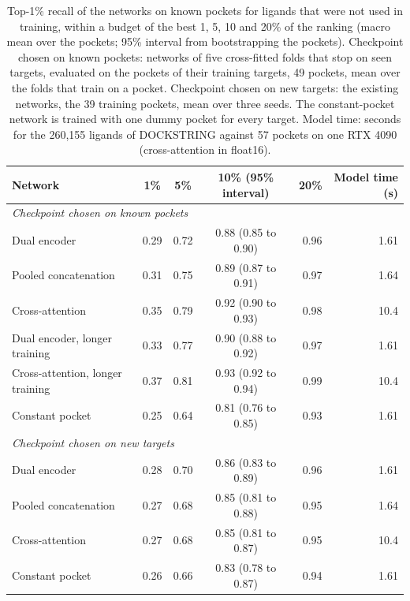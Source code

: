 \begin{table}[h]
\caption{Top-1\% recall of the networks on known pockets for ligands that were not used in training, within a budget of the best 1, 5, 10 and 20\% of the ranking (macro mean over the pockets; 95\% interval from bootstrapping the pockets). Checkpoint chosen on known pockets: networks of five cross-fitted folds that stop on seen targets, evaluated on the pockets of their training targets, 49 pockets, mean over the folds that train on a pocket. Checkpoint chosen on new targets: the existing networks, the 39 training pockets, mean over three seeds. The constant-pocket network is trained with one dummy pocket for every target. Model time: seconds for the 260{,}155 ligands of DOCKSTRING against 57 pockets on one RTX 4090 (cross-attention in float16).}
\label{tab:si_recall_all}
\centering
\footnotesize
\setlength{\tabcolsep}{3pt}
\begin{tabular}{lcccrr}
\toprule
Network & 1\% & 5\% & 10\% (95\% interval) & 20\% & Model time (s) \\
\midrule
\multicolumn{6}{l}{\emph{Checkpoint chosen on known pockets}} \\
\quad Dual encoder & 0.29 & 0.72 & 0.88 (0.85 to 0.90) & 0.96 & 1.61 \\
\quad Pooled concatenation & 0.31 & 0.75 & 0.89 (0.87 to 0.91) & 0.97 & 1.64 \\
\quad Cross-attention & 0.35 & 0.79 & 0.92 (0.90 to 0.93) & 0.98 & 10.4 \\
\quad Dual encoder, longer training & 0.33 & 0.77 & 0.90 (0.88 to 0.92) & 0.97 & 1.61 \\
\quad Cross-attention, longer training & 0.37 & 0.81 & 0.93 (0.92 to 0.94) & 0.99 & 10.4 \\
\quad Constant pocket & 0.25 & 0.64 & 0.81 (0.76 to 0.85) & 0.93 & 1.61 \\
\midrule
\multicolumn{6}{l}{\emph{Checkpoint chosen on new targets}} \\
\quad Dual encoder & 0.28 & 0.70 & 0.86 (0.83 to 0.89) & 0.96 & 1.61 \\
\quad Pooled concatenation & 0.27 & 0.68 & 0.85 (0.81 to 0.88) & 0.95 & 1.64 \\
\quad Cross-attention & 0.27 & 0.68 & 0.85 (0.81 to 0.87) & 0.95 & 10.4 \\
\quad Constant pocket & 0.26 & 0.66 & 0.83 (0.78 to 0.87) & 0.94 & 1.61 \\
\bottomrule
\end{tabular}
\end{table}
